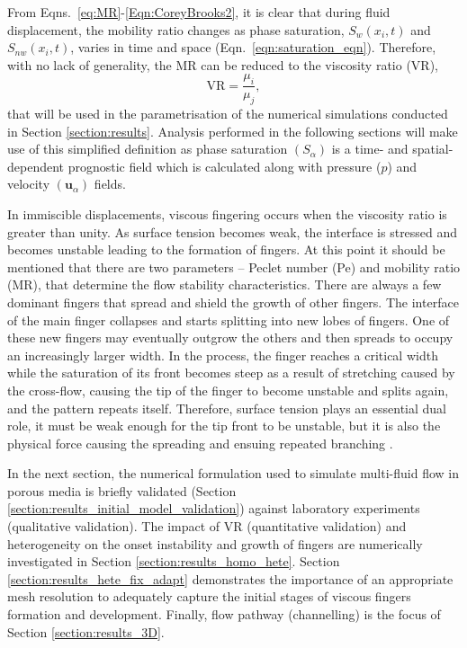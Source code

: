 \documentclass[preprint,authoryear,12pt]{elsarticle}
\newcommand{\frc}{\displaystyle\frac}
\begin{document}
From Eqns.~\ref{eq:MR}-\ref{Eqn:CoreyBrooks2}, it is clear that during fluid displacement, the mobility ratio changes as phase saturation, $S_{w}\left(x_{i},t\right)$ and $S_{nw}\left(x_{i},t\right)$, varies in time and space (Eqn.~\ref{eqn:saturation_eqn}). Therefore, with no lack of generality, the MR can be reduced to the viscosity ratio (VR),
\begin{displaymath}
    \text{VR} = \frc{\mu_{i}}{\mu_{j}},
\end{displaymath}
 that will be used in the parametrisation of the numerical simulations conducted in Section \ref{section:results}. Analysis performed in the following sections will make use of this simplified definition as phase saturation $\left(S_{\alpha}\right)$ is a time- and spatial-dependent prognostic field which is calculated along with pressure ($p$) and velocity $\left(\mathbf{u}_{\alpha}\right)$ fields.

\medskip
In immiscible displacements, viscous fingering occurs when the viscosity ratio is greater than unity. As surface tension becomes weak, the interface is stressed and becomes unstable leading to the formation of fingers. At this point it should be mentioned that there are two parameters -- Peclet number (Pe) and mobility ratio (MR), that determine the flow stability characteristics. There are always a few dominant fingers that spread and shield the growth of other fingers. The interface of the main finger collapses and starts splitting into new lobes of fingers. One of these new fingers may eventually outgrow the others and then spreads to occupy an increasingly larger width. In the process, the finger reaches a critical width while the saturation %
of its front becomes steep as a result of stretching caused by the cross-flow, causing the tip of the finger to become unstable and splits again, and the pattern repeats itself. Therefore, surface tension plays an essential dual role, it must be weak enough for the tip front to be unstable, but it is also the physical force causing the spreading and ensuing repeated branching \citep{tan_1988, carvalho_2013}.

\medskip
In the next section, the numerical formulation used to simulate multi-fluid flow in porous media is briefly validated (Section \ref{section:results_initial_model_validation}) against laboratory experiments (qualitative validation). The impact of VR (quantitative validation) and heterogeneity on the onset instability and growth of fingers are numerically investigated in Section \ref{section:results_homo_hete}. Section \ref{section:results_hete_fix_adapt} demonstrates the importance of an appropriate mesh resolution to adequately capture the initial stages of viscous fingers formation and development. Finally, flow pathway (channelling) is the focus of Section \ref{section:results_3D}.
\end{document}
